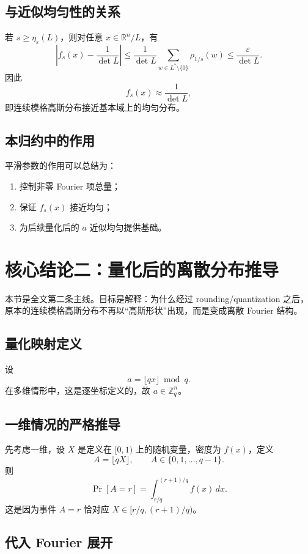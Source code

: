 \documentclass[12pt,a4paper]{ctexart}
\newcommand{\R}{\mathbb{R}}
\newcommand{\Z}{\mathbb{Z}}
\newcommand{\eps}{\varepsilon}
\newcommand{\dual}{^{*}}
\begin{document}
\subsection{与近似均匀性的关系}

若 \(s\ge \eta_\eps(L)\)，则对任意 \(x\in \R^n/L\)，有
\[
\left|
f_s(x)-\frac{1}{\det L}
\right|
\le
\frac{1}{\det L}\sum_{w\in L\dual\setminus\{0\}}\rho_{1/s}(w)
\le
\frac{\eps}{\det L}.
\]
因此
\[
f_s(x)\approx \frac{1}{\det L},
\]
即连续模格高斯分布接近基本域上的均匀分布。

\subsection{本归约中的作用}

平滑参数的作用可以总结为：

\begin{enumerate}[label=\arabic*.]
    \item 控制非零 Fourier 项总量；
    \item 保证 \(f_s(x)\) 接近均匀；
    \item 为后续量化后的 \(a\) 近似均匀提供基础。
\end{enumerate}

\section{核心结论二：量化后的离散分布推导}

本节是全文第二条主线。目标是解释：为什么经过 rounding/quantization 之后，原本的连续模格高斯分布不再以“高斯形状”出现，而是变成离散 Fourier 结构。

\subsection{量化映射定义}

设
\[
a=\lfloor qx\rfloor \bmod q.
\]
在多维情形中，这是逐坐标定义的，故 \(a\in \Z_q^n\)。

\subsection{一维情况的严格推导}

先考虑一维，设 \(X\) 是定义在 \([0,1)\) 上的随机变量，密度为 \(f(x)\)，定义
\[
A=\lfloor qX\rfloor,\qquad A\in \{0,1,\dots,q-1\}.
\]
则
\[
\Pr[A=r]
=
\int_{r/q}^{(r+1)/q} f(x)\,dx.
\]
这是因为事件 \(A=r\) 恰对应 \(X\in [r/q,(r+1)/q)\)。

\subsection{代入 Fourier 展开}
\end{document}
